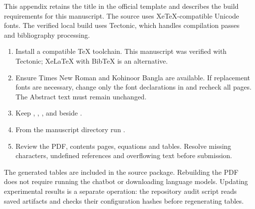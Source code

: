 This appendix retains the title in the official template and describes the build requirements for this manuscript. The source uses XeTeX-compatible Unicode fonts. The verified local build uses Tectonic, which handles compilation passes and bibliography processing.

\begin{enumerate}
\item Install a compatible TeX toolchain. This manuscript was verified with Tectonic; XeLaTeX with BibTeX is an alternative.
\item Ensure Times New Roman and Kohinoor Bangla are available. If replacement fonts are necessary, change only the font declarations in  and recheck all pages. The Abstract text must remain unchanged.
\item Keep , , ,  and  beside .
\item From the manuscript directory run .
\item Review the PDF, contents pages, equations and tables. Resolve missing characters, undefined references and overflowing text before submission.
\end{enumerate}

The generated tables are included in the source package. Rebuilding the PDF does not require running the chatbot or downloading language models. Updating experimental results is a separate operation: the repository audit script reads saved artifacts and checks their configuration hashes before regenerating tables.
